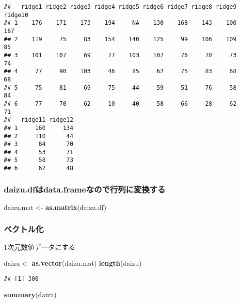 \documentclass[]{article}
\newenvironment{Shaded}{\begin{snugshade}}{\end{snugshade}}
\newcommand{\KeywordTok}[1]{\textcolor[rgb]{0.13,0.29,0.53}{\textbf{#1}}}
\newcommand{\NormalTok}[1]{#1}
\newcommand{\StringTok}[1]{\textcolor[rgb]{0.31,0.60,0.02}{#1}}
\begin{document}
\begin{verbatim}
##   ridge1 ridge2 ridge3 ridge4 ridge5 ridge6 ridge7 ridge8 ridge9 ridge10
## 1    176    171    173    194     NA    130    168    143    100     167
## 2    119     75     83    154    140    125     99    106    109      85
## 3    101    107     69     77    103    107     76     70     73      74
## 4     77     90    103     46     85     62     75     83     68      68
## 5     75     81     69     75     44     59     51     76     58      84
## 6     77     70     62     10     40     58     66     28     62      71
##   ridge11 ridge12
## 1     160     134
## 2     110      44
## 3      84      70
## 4      53      71
## 5      58      73
## 6      62      48
\end{verbatim}

\hypertarget{daizu.dfux306fdata.frameux306aux306eux3067ux884cux5217ux306bux5909ux63dbux3059ux308b}{%
\subsubsection{daizu.dfはdata.frameなので行列に変換する}\label{daizu.dfux306fdata.frameux306aux306eux3067ux884cux5217ux306bux5909ux63dbux3059ux308b}}

\begin{Shaded}
\begin{Highlighting}[]
\NormalTok{    daizu.mat <-}\StringTok{ }\KeywordTok{as.matrix}\NormalTok{(daizu.df)}
\end{Highlighting}
\end{Shaded}

\hypertarget{ux30d9ux30afux30c8ux30ebux5316}{%
\subsubsection{ベクトル化}\label{ux30d9ux30afux30c8ux30ebux5316}}

1次元数値データにする

\begin{Shaded}
\begin{Highlighting}[]
\NormalTok{    daizu <-}\StringTok{ }\KeywordTok{as.vector}\NormalTok{(daizu.mat)}
    \KeywordTok{length}\NormalTok{(daizu)}
\end{Highlighting}
\end{Shaded}

\begin{verbatim}
## [1] 300
\end{verbatim}

\begin{Shaded}
\begin{Highlighting}[]
    \KeywordTok{summary}\NormalTok{(daizu)}
\end{Highlighting}
\end{Shaded}
\end{document}
